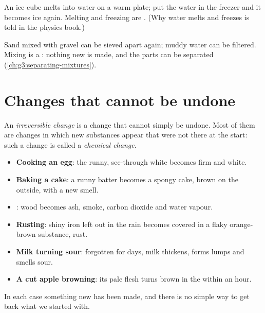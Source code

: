 \begin{example}\label{ex:g5:irreversible-changes:ice}
An ice cube melts into water on a warm plate; put the water in the
freezer and it becomes ice again. Melting and freezing are . (Why water melts and freezes is told in the physics book.)
\end{example}

\begin{example}[Mixing]\label{ex:g5:irreversible-changes:mix}
Sand mixed with gravel can be sieved apart again; muddy water can be
filtered. Mixing is a : nothing new is made, and the
parts can be separated (\cref{ch:g3:separating-mixtures}).
\end{example}

\section{Changes that cannot be undone}

\begin{definition}\label{def:g5:irreversible-changes:chemical-change}
An \emph{irreversible change} is a change that
cannot simply be undone. Most of them are changes in which new
substances appear that were not there at the start: such a change is
called a \emph{chemical change}.
\end{definition}

\begin{example}\label{ex:g5:irreversible-changes:six}
\begin{itemize}
  \item \textbf{Cooking an egg}: the runny, see-through white becomes
        firm and white.
  \item \textbf{Baking a cake}: a runny batter becomes a spongy cake,
        brown on the outside, with a new smell.
  \item \textbf{}: wood becomes ash, smoke, carbon dioxide and
        water vapour.
  \item \textbf{Rusting}: shiny iron left out in the rain becomes
        covered in a flaky orange-brown substance, rust.
  \item \textbf{Milk turning sour}: forgotten for days, milk thickens,
        forms lumps and smells sour.
  \item \textbf{A cut apple browning}: its pale flesh turns brown in the
         within an hour.
\end{itemize}
In each case something new has been made, and there is no simple way to
get back what we started with.
\end{example}

